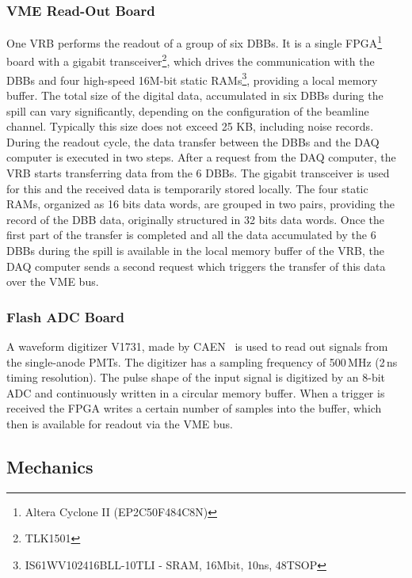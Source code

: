 \documentclass[a4paper,11pt]{article}
\begin{document}
\subsubsection{VME Read-Out Board}\label{electronics:subsec:vme_readout_board}

One VRB performs the readout of a group of six DBBs. It is a single FPGA\footnote{Altera Cyclone II (EP2C50F484C8N)} board with a gigabit 
transceiver\footnote{TLK1501}, which drives the communication with the DBBs and four high-speed 16M-bit static RAMs\footnote{IS61WV102416BLL-10TLI
- SRAM, 16Mbit, 10ns, 48TSOP}, providing a local memory buffer. The total size of the digital data, accumulated in six DBBs during the spill can vary
significantly, depending on the configuration of the beamline channel. Typically this size does not exceed 25 KB, including noise records. During the
readout cycle, the data transfer between the DBBs and the DAQ computer is executed in two steps. After a request from the DAQ computer, the VRB starts
transferring data from the 6 DBBs. The gigabit transceiver is used for this and the received data is temporarily stored locally. The four static RAMs,
organized as 16 bits data words, are grouped in two pairs, providing the record of the DBB data, originally structured in 32 bits data words. Once the
first part of the transfer is completed and all the data accumulated by the 6 DBBs during the spill is available in the local memory buffer of the VRB,
the DAQ computer sends a second request which triggers the transfer of this data over the VME bus.

\subsubsection{Flash ADC Board}\label{electronics:subsec:fast_adc_board}

A waveform digitizer V1731, made by CAEN~\cite{V1731} is used to read out signals from the single-anode PMTs. The digitizer has a sampling frequency
of 500\,MHz (2\,ns timing resolution). The pulse shape of the input signal is digitized by an 8-bit ADC and continuously written in a circular memory
buffer. When a trigger is received the FPGA writes a certain number of samples into the buffer, which then is available for readout via the VME bus.

\subsection{Mechanics}\label{design:subsec:mechanics}
\end{document}
